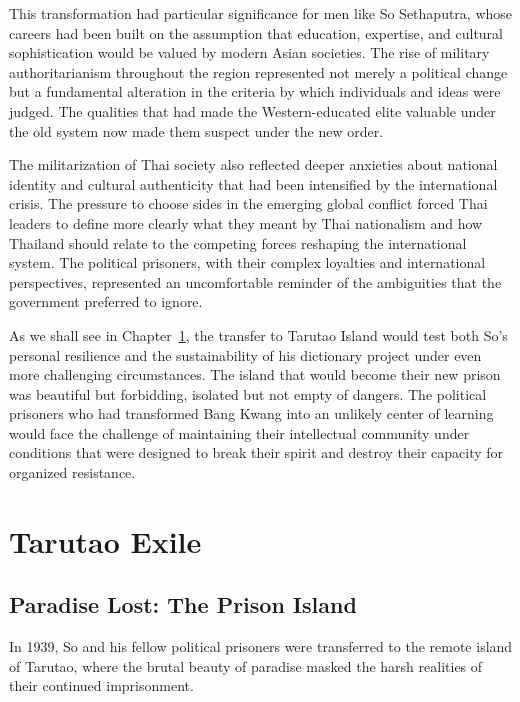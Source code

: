 \documentclass[
  Letterpaper,
]{scrbook}
\begin{document}
This transformation had particular significance for men like So
Sethaputra, whose careers had been built on the assumption that
education, expertise, and cultural sophistication would be valued by
modern Asian societies. The rise of military authoritarianism throughout
the region represented not merely a political change but a fundamental
alteration in the criteria by which individuals and ideas were judged.
The qualities that had made the Western-educated elite valuable under
the old system now made them suspect under the new order.

The militarization of Thai society also reflected deeper anxieties about
national identity and cultural authenticity that had been intensified by
the international crisis. The pressure to choose sides in the emerging
global conflict forced Thai leaders to define more clearly what they
meant by Thai nationalism and how Thailand should relate to the
competing forces reshaping the international system. The political
prisoners, with their complex loyalties and international perspectives,
represented an uncomfortable reminder of the ambiguities that the
government preferred to ignore.

As we shall see in Chapter~\ref{sec-tarutao-exile}, the transfer to
Tarutao Island would test both So's personal resilience and the
sustainability of his dictionary project under even more challenging
circumstances. The island that would become their new prison was
beautiful but forbidding, isolated but not empty of dangers. The
political prisoners who had transformed Bang Kwang into an unlikely
center of learning would face the challenge of maintaining their
intellectual community under conditions that were designed to break
their spirit and destroy their capacity for organized resistance.


\chapter{Tarutao Exile}\label{sec-tarutao-exile}

\section{Paradise Lost: The Prison
Island}\label{paradise-lost-the-prison-island}

In 1939, So and his fellow political prisoners were transferred to the
remote island of Tarutao, where the brutal beauty of paradise masked the
harsh realities of their continued imprisonment.
\end{document}
